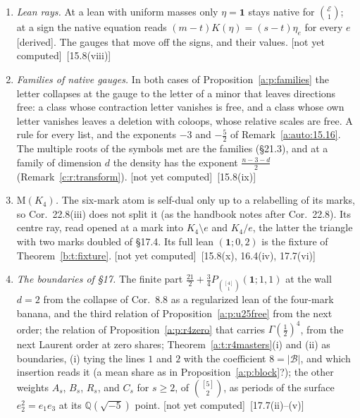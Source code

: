 \documentclass[11pt]{article}
\newcommand{\cE}{\mathcal E}
\newcommand{\cB}{\mathcal B}
\newcommand{\one}{\mathbf 1}
\newcommand{\Pfour}{P_{\binom{[4]}1}(\one;1,1)}
\theoremstyle{plain}
\theoremstyle{definition}
\theoremstyle{remark}
\newcommand{\derived}{\textup{[derived]}}
\newcommand{\notyet}{\textup{[not yet computed]}}
\begin{document}
\begin{enumerate}[label=\textbf{O\arabic*},ref=O\arabic*,leftmargin=*,itemsep=4pt]
\item\label{o:leans} \emph{Lean rays.} At a lean with uniform masses only $\eta=\one$ stays native for $\binom{\cE}1$; at a sign the native equation reads $(m-t)K(\eta)=(s-t)\eta_e$ for every $e$ \derived. The gauges that move off the signs, and their values. \notyet\ {\small[15.8(viii)]}
\item\label{o:families} \emph{Families of native gauges.} In both cases of Proposition~\ref{a:p:families} the letter collapses at the gauge to the letter of a minor that leaves directions free: a class whose contraction letter vanishes is free, and a class whose own letter vanishes leaves a deletion with coloops, whose relative scales are free. A rule for every list, and the exponents $-3$ and $-\frac52$ of Remark~\ref{a:auto:15.16}. The multiple roots of the symbols met are the families (\S21.3), and at a family of dimension $d$ the density has the exponent $\frac{n-3-d}2$ (Remark~\ref{c:r:transform}). \notyet\ {\small[15.8(ix)]}
\item\label{o:MK4} \emph{$\mathrm M(K_4)$.} The six-mark atom is self-dual only up to a relabelling of its marks, so Cor.~22.8(iii) does not split it (as the handbook notes after Cor.~22.8). Its centre ray, read opened at a mark into $K_4\setminus e$ and $K_4/e$, the latter the triangle with two marks doubled of \S17.4. Its full lean $(\one;0,2)$ is the fixture of Theorem~\ref{b:t:fixture}. \notyet\ {\small[15.8(x), 16.4(iv), 17.7(vi)]}
\item\label{o:bounds17} \emph{The boundaries of \S17.} The finite part $\frac{21}2+\frac34\Pfour$ at the wall $d=2$ from the collapse of Cor.~8.8 as a regularized lean of the four-mark banana, and the third relation of Proposition~\ref{a:p:u25free} from the next order; the relation of Proposition~\ref{a:p:r4zero} that carries $\Gamma(\frac12)^4$, from the next Laurent order at zero shares; Theorem~\ref{a:t:r4masters}(i) and (ii) as boundaries, (i) tying the lines $1$ and $2$ with the coefficient $8=|\cB|$, and which insertion reads it (a mean share as in Proposition~\ref{a:p:block}?); the other weights $A_s$, $B_s$, $R_s$, and $C_s$ for $s\ge2$, of $\binom{[5]}2$, as periods of the surface $e_2^2=e_1e_3$ at its $\mathbb Q(\sqrt{-5})$ point. \notyet\ {\small[17.7(ii)--(v)]}
\end{enumerate}
\end{document}
